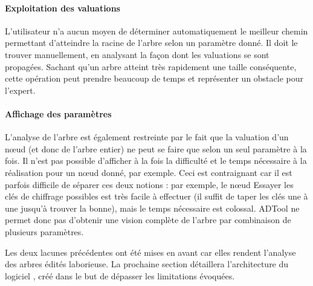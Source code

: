 	\paragraph{Exploitation des valuations} L'utilisateur n'a aucun moyen de déterminer automatiquement le \og meilleur chemin \fg{} permettant d'atteindre la racine de l'arbre selon un paramètre donné. Il doit le trouver manuellement, en analysant la façon dont les valuations se sont propagées. Sachant qu'un arbre atteint très rapidement une taille conséquente, cette opération peut prendre beaucoup de temps et représenter un obstacle pour l'expert.

	\paragraph{Affichage des paramètres} L'analyse de l'arbre est également restreinte par le fait que la valuation d'un nœud (et donc de l'arbre entier) ne peut se faire que selon un seul paramètre à la fois. Il n'est pas possible d'afficher à la fois la \og difficulté \fg{} et le \og temps nécessaire \fg{} à la réalisation pour un nœud donné, par exemple. Ceci est contraignant car il est parfois difficile de séparer ces deux notions : par exemple, le nœud \og Essayer les clés de chiffrage possibles \fg{} est très facile à effectuer (il suffit de taper les clés une à une jusqu'à trouver la bonne), mais le temps nécessaire est colossal. ADTool ne permet donc pas d'obtenir une vision complète de l'arbre par combinaison de plusieurs paramètres.

	Les deux lacunes précédentes ont été mises en avant car elles rendent l'analyse des arbres édités laborieuse. La prochaine section détaillera l'architecture du logiciel \glasir{}, créé dans le but de dépasser les limitations évoquées.